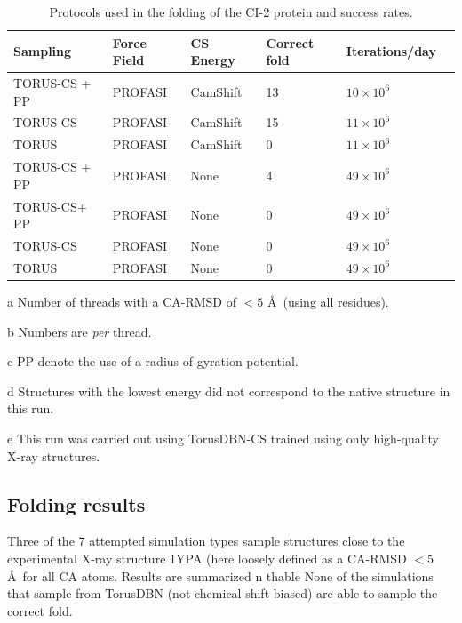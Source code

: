 \begin{table}[h]
    \caption{Protocols used in the folding of the CI-2 protein and success rates.}
    \begin{center}
    \begin{threeparttable}
    \begin{tabular}{l l l l l l}
        Sampling        & Force Field   & CS Energy         & Correct fold\tnote{a} & Iterations/day\tnote{b}\\\hline
          TORUS-CS + PP\tnote{c} & PROFASI       & CamShift          & 13            & $10 \times 10^6$ \\
          TORUS-CS      & PROFASI       & CamShift          & 15            & $11 \times 10^6$\\
          TORUS         & PROFASI       & CamShift          & 0             & $11 \times 10^6$\\
 TORUS-CS + PP\tnote{c} & PROFASI       & None              & 4\tnote{d}      & $49 \times 10^6$\\
 TORUS-CS\tnote{e}+ PP\tnote{c} & PROFASI      & None              & 0             & $49 \times 10^6$\\
          TORUS-CS      & PROFASI       & None              & 0             & $49 \times 10^6$\\
          TORUS         & PROFASI       & None              & 0             & $49 \times 10^6$\\
    \end{tabular}
    \begin{tablenotes}
        \item[a] Number of threads with a CA-RMSD of $<5$ \AA\ (using all residues).\\
        \item[b] Numbers are \textit{per} thread.
        \item[c] PP denote the use of a radius of gyration potential.\\
        \item[d] Structures with the lowest energy did not correspond to the native structure in this run.\\
        \item[e] This run was carried out using TorusDBN-CS trained using only high-quality X-ray structures.
    \end{tablenotes}
    \end{threeparttable}
    \end{center}
    \label{tab:ci2}
\end{table}
\subsection{Folding results}
\label{sec:ci2_results}
Three of the 7 attempted simulation types sample structures close to the experimental X-ray structure 1YPA (here loosely defined as a CA-RMSD $<5$ \AA\ for all CA atoms. Results are summarized n thable
None of the simulations that sample from TorusDBN (not chemical shift biased) are able to sample the correct fold.

